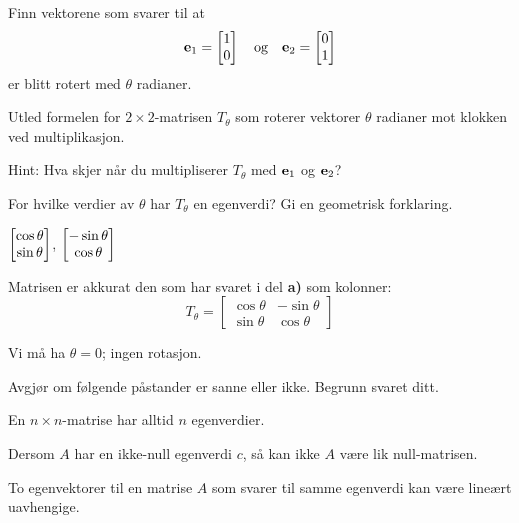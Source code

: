 \begin{oppgave}

\begin{punkt}
Finn vektorene som svarer til at $$\mathbf{e}_1 = \begin{bmatrix} 1 \\ 0 \end{bmatrix}\quad \text{og}\quad\mathbf{e}_2= \begin{bmatrix} 0 \\ 1 \end{bmatrix}$$ er blitt rotert med $\theta$ radianer.
\end{punkt}

\begin{punkt}
Utled formelen for $2 \times 2$-matrisen $T_\theta$ som roterer vektorer $\theta$ radianer mot klokken ved multiplikasjon.

\noindent
Hint: Hva skjer når du multipliserer $T_\theta$ med $\mathbf{e}_1$ og $\mathbf{e}_2$?
\end{punkt}

\begin{punkt}
For hvilke verdier av $\theta$ har $T_\theta$ en egenverdi? Gi en geometrisk forklaring.
\end{punkt}


\end{oppgave}


\begin{losning}

\begin{punkt}
$\begin{bmatrix} \cos\theta \\ \sin\theta \end{bmatrix}$, $\begin{bmatrix} -\sin\theta \\ \cos\theta \end{bmatrix}$
\end{punkt}

\begin{punkt}
Matrisen er akkurat den som har svaret i del \textbf{a)} som kolonner:
$$T_\theta=\begin{bmatrix}
\cos\theta & -\sin\theta\\
\sin\theta & \cos\theta
\end{bmatrix}$$
\end{punkt}

\begin{punkt}
Vi må ha $\theta=0$; ingen rotasjon.
\end{punkt}

\end{losning}

\begin{oppgave}
Avgjør om følgende påstander er sanne eller ikke. Begrunn svaret ditt.

\begin{punkt}
En $n\times n$-matrise har alltid $n$ egenverdier.
\end{punkt}

\begin{punkt}
Dersom $A$ har en ikke-null egenverdi $c$, så kan ikke $A$ være lik null-matrisen.
\end{punkt}


\begin{punkt}
To egenvektorer til en matrise $A$ som svarer til samme egenverdi kan være lineært uavhengige.
\end{punkt}



\end{oppgave}

